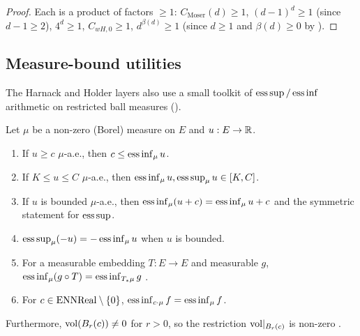 \begin{proof}
\leanok
{}

Each is a product of factors $\geq 1$: $C_{\mathrm{Moser}}(d) \geq 1$,
$(d-1)^d \geq 1$ (since $d-1 \geq 2$), $4^d \geq 1$, $C_{wH,0} \geq 1$,
$d^{\beta(d)} \geq 1$ (since $d \geq 1$ and $\beta(d) \geq 0$ by
).
\end{proof}

\subsection{Measure-bound utilities}

The Harnack and Holder layers also use a small toolkit of $\operatorname*{ess\,sup}/\operatorname*{ess\,inf}$
arithmetic on restricted ball measures ().

\begin{lemma}
\label{lem:meas-bd}
\leanok
Let $\mu$ be a non-zero (Borel) measure on $E$ and $u : E \to \mathbb{R}$.
\begin{enumerate}
\item If $u \geq c$ $\mu$-a.e., then $c \leq \operatorname*{ess\,inf}_\mu u$.
\item If $K \leq u \leq C$ $\mu$-a.e., then $\operatorname*{ess\,inf}_\mu u, \operatorname*{ess\,sup}_\mu u
  \in [K,C]$.
\item If $u$ is bounded $\mu$-a.e., then
  $\operatorname*{ess\,inf}_\mu(u+c) = \operatorname*{ess\,inf}_\mu u + c$ and the symmetric statement for
  $\operatorname*{ess\,sup}$.
\item $\operatorname*{ess\,sup}_\mu(-u) = -\operatorname*{ess\,inf}_\mu u$ when $u$ is bounded.
\item For a measurable embedding $T : E\to E$ and measurable $g$,
  $\operatorname*{ess\,inf}_\mu(g\circ T) = \operatorname*{ess\,inf}_{T_*\mu} g$ .
\item For $c \in \mathrm{ENNReal}\setminus\{0\}$, $\operatorname*{ess\,inf}_{c\cdot \mu}f =
  \operatorname*{ess\,inf}_\mu f$.
\end{enumerate}
Furthermore, $\mathrm{vol}(B_{r}(c))\neq 0$ for $r > 0$, so the restriction
$\mathrm{vol}|_{B_{r}(c)}$ is non-zero .
\end{lemma}

